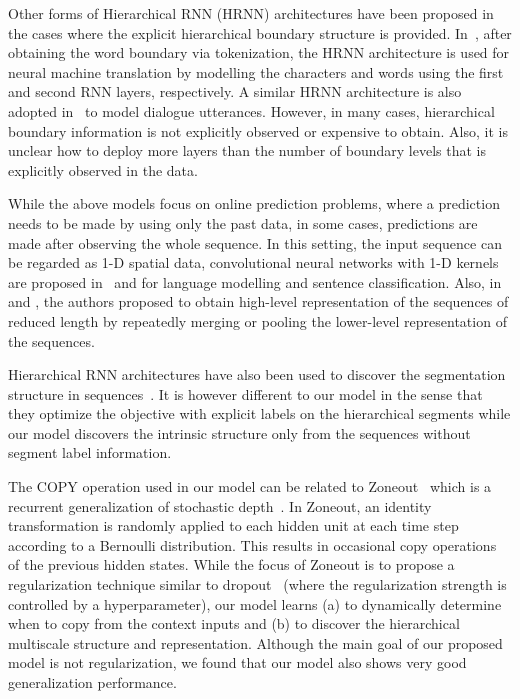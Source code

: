 \documentclass{article} %
\begin{document}
Other forms of Hierarchical RNN (HRNN) architectures have been proposed in the cases where the explicit hierarchical boundary structure is provided. 
In~\citet{ling2015character}, after obtaining the word boundary via tokenization, the HRNN architecture is used for neural machine translation by modelling the characters and words using the first and second RNN layers, respectively. 
A similar HRNN architecture is also adopted in~\citet{sordoni2015hierarchical} to model dialogue utterances. 
However, in many cases, hierarchical boundary information is not explicitly observed or expensive to obtain. 
Also, it is unclear how to deploy more layers than the number of boundary levels that is explicitly observed in the data.

While the above models focus on online prediction problems, 
where a prediction needs to be made by using only the past data, 
in some cases, predictions are made after observing the whole sequence. 
In this setting, the input sequence can be regarded as 1-D spatial data, 
convolutional neural networks with 1-D kernels are proposed in~\citet{kim2014convolutional} and \citet{kim2015character} 
for language modelling and sentence classification. 
Also, in~\citet{chan2016listen} and \citet{bahdanau2016end}, the authors proposed to obtain high-level representation of the sequences
of reduced length by repeatedly merging or pooling the lower-level representation of the sequences.


Hierarchical RNN architectures have also been used to discover the segmentation structure in sequences~\citep{fernandez2007sequence,kong2015segmental}.
It is however different to our model in the sense that they optimize the objective with explicit labels on the hierarchical segments while our model discovers the intrinsic structure only from the sequences without segment label information.

The COPY operation used in our model can be related to Zoneout~\citep{krueger2016zoneout} which is a recurrent generalization of stochastic depth~\citep{huang2016deep}.
In Zoneout, an identity transformation is randomly applied to each hidden unit at each time step according to a Bernoulli distribution.
This results in occasional copy operations of the previous hidden states. 
While the focus of Zoneout is to propose a regularization technique similar to dropout~\citep{srivastava2014dropout} 
(where the regularization strength is controlled by a hyperparameter), 
our model learns (a) to dynamically determine when to copy from the context inputs and (b) to discover the hierarchical multiscale structure and representation.
Although the main goal of our proposed model is not regularization, 
we found that our model also shows very good generalization performance.
\end{document}
